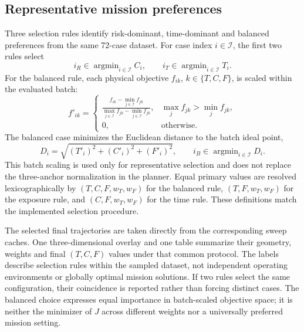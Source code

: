 \documentclass[preprint,12pt]{elsarticle}
\begin{document}
\subsection{Representative mission preferences}
\label{sec:representative}

Three selection rules identify risk-dominant, time-dominant and balanced
preferences from the same 72-case dataset. For case index $i\in\mathcal I$,
the first two rules select
\begin{equation}
 i_R\in\mathop{\arg\min}_{i\in\mathcal I} C_i,\qquad
 i_T\in\mathop{\arg\min}_{i\in\mathcal I} T_i.
 \label{ex:eq:extremecases}
\end{equation}
For the balanced rule, each physical objective $f_{ik}$,
$k\in\{T,C,F\}$, is scaled within the evaluated batch:
\begin{equation}
 f'_{ik}=\begin{cases}
 \displaystyle\frac{f_{ik}-\min_{j\in\mathcal I}f_{jk}}
 {\max_{j\in\mathcal I}f_{jk}-\min_{j\in\mathcal I}f_{jk}},
 &\max_j f_{jk}>\min_j f_{jk},\\
 0,&\text{otherwise}.
 \end{cases}
 \label{ex:eq:batchscale}
\end{equation}
The balanced case minimizes the Euclidean distance to the batch ideal point,
\begin{equation}
 D_i=\sqrt{(T'_i)^2+(C'_i)^2+(F'_i)^2},\qquad
 i_B\in\mathop{\arg\min}_{i\in\mathcal I}D_i.
 \label{ex:eq:balancedcase}
\end{equation}
This batch scaling is used only for representative selection and does
not replace the three-anchor normalization in the planner. Equal primary
values are resolved lexicographically by $(T,C,F,w_T,w_F)$ for the balanced
rule, $(T,F,w_T,w_F)$ for the exposure rule, and $(C,F,w_T,w_F)$ for the
time rule. These definitions match the implemented selection procedure.

The selected final trajectories are taken directly from the corresponding
sweep caches. One three-dimensional overlay and one table summarize their
geometry, weights and final $(T,C,F)$ values under that common protocol.
The labels describe selection rules within the sampled dataset, not
independent operating environments or globally optimal mission solutions.
If two rules select the same configuration, their coincidence is reported
rather than forcing distinct cases. The balanced choice expresses equal
importance in batch-scaled objective space; it is neither the minimizer
of $J$ across different weights nor a universally preferred mission setting.
\end{document}
